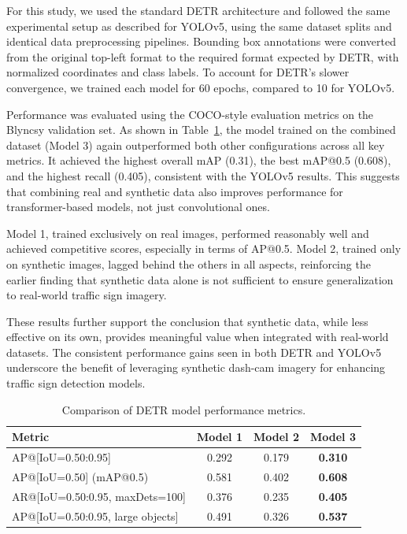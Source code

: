 \documentclass[journal]{IEEEtran}
\begin{document}
For this study, we used the standard DETR architecture and followed the same experimental setup as described for YOLOv5, using the same dataset splits and identical data preprocessing pipelines. Bounding box annotations were converted from the original top-left format to the required format expected by DETR, with normalized coordinates and class labels. To account for DETR’s slower convergence, we trained each model for 60 epochs, compared to 10 for YOLOv5.

Performance was evaluated using the COCO-style evaluation metrics on the Blyncsy validation set. As shown in Table~\ref{tab:detr_model_comparison}, the model trained on the combined dataset (Model 3) again outperformed both other configurations across all key metrics. It achieved the highest overall mAP (0.31), the best mAP@0.5 (0.608), and the highest recall (0.405), consistent with the YOLOv5 results. This suggests that combining real and synthetic data also improves performance for transformer-based models, not just convolutional ones.

Model 1, trained exclusively on real images, performed reasonably well and achieved competitive scores, especially in terms of AP@0.5. Model 2, trained only on synthetic images, lagged behind the others in all aspects, reinforcing the earlier finding that synthetic data alone is not sufficient to ensure generalization to real-world traffic sign imagery.

These results further support the conclusion that synthetic data, while less effective on its own, provides meaningful value when integrated with real-world datasets. The consistent performance gains seen in both DETR and YOLOv5 underscore the benefit of leveraging synthetic dash-cam imagery for enhancing traffic sign detection models.

\begin{table}[ht]
\centering
\begin{tabular}{|l|c|c|c|}
\hline %
\textbf{Metric} & \textbf{Model 1} & \textbf{Model 2} & \textbf{Model 3} \\
\hline %
AP@[IoU=0.50:0.95] & 0.292 & 0.179 & \textbf{0.310} \\
AP@[IoU=0.50] (mAP@0.5) & 0.581 & 0.402 & \textbf{0.608} \\
AR@[IoU=0.50:0.95, maxDets=100] & 0.376 & 0.235 & \textbf{0.405}\\
AP@[IoU=0.50:0.95, large objects] & 0.491 & 0.326 & \textbf{0.537} \\
\hline %
\end{tabular}
\caption{Comparison of DETR model performance metrics.}
\label{tab:detr_model_comparison}
\end{table}
\end{document}
